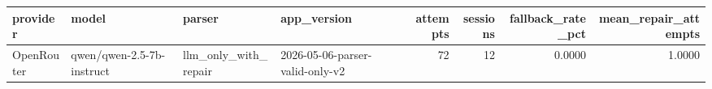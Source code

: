\begin{tabular}{llllrrrr}
\toprule
  provider &                     model &               parser &                     app\_version &  attempts &  sessions &  fallback\_rate\_pct &  mean\_repair\_attempts \\
\midrule
OpenRouter & qwen/qwen-2.5-7b-instruct & llm\_only\_with\_repair & 2026-05-06-parser-valid-only-v2 &        72 &        12 &             0.0000 &                1.0000 \\
\bottomrule
\end{tabular}
